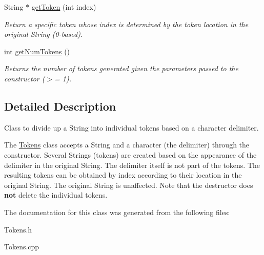 \begin{DoxyCompactItemize}
String $\ast$ \hyperlink{class_tokens_ab7afcc723baf9f48a9150a2f2d8bb2e5}{get\+Token} (int index)
\begin{DoxyCompactList}\small\item\em Return a specific token whose index is determined by the token location in the original String (0-\/based). \end{DoxyCompactList}\item 
\mbox{\label{class_tokens_aa34f5363d72f5c761f7b9f9164067efe}} 
int \hyperlink{class_tokens_aa34f5363d72f5c761f7b9f9164067efe}{get\+Num\+Tokens} ()
\begin{DoxyCompactList}\small\item\em Returns the number of tokens generated given the parameters passed to the constructor ($>$= 1). \end{DoxyCompactList}\end{DoxyCompactItemize}


\subsection{Detailed Description}
Class to divide up a String into individual tokens based on a character delimiter. 

The \hyperlink{class_tokens}{Tokens} class accepts a String and a character (the delimiter) through the constructor. Several Strings (tokens) are created based on the appearance of the delimiter in the original String. The delimiter itself is not part of the tokens. The resulting tokens can be obtained by index according to their location in the original String. The original String is unaffected. Note that the destructor does {\bfseries not} delete the individual tokens. 

The documentation for this class was generated from the following files\+:\begin{DoxyCompactItemize}
\item 
Tokens.\+h\item 
Tokens.\+cpp\end{DoxyCompactItemize}

